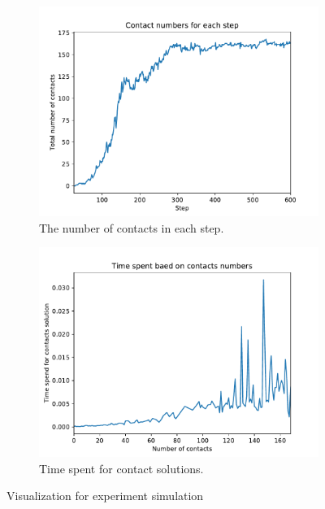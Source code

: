     \begin{figure}[!ht]
        \centering
        \begin{subfigure}[b]{0.7\textwidth}
            \includegraphics[width=\textwidth]{Figures/contact_num}
            \caption{The number of contacts in each step.}
            \label{fig:contactnum}
        \end{subfigure}
        \begin{subfigure}[b]{0.7\textwidth}
            \includegraphics[width=\textwidth]{Figures/contact_time}
            \caption{Time spent for contact solutions.}
            \label{fig:contacttime}
        \end{subfigure}
        \caption{Visualization for experiment simulation}
    \end{figure}

